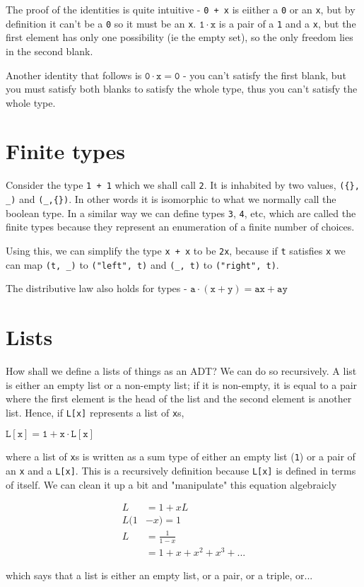 \documentclass{article}
\begin{document}
The proof of the identities is quite intuitive - \verb!0 + x! is eiither a \verb!0! or an \verb!x!, but by definition it can't be a \verb!0! so it must be an \verb!x!. $\mathtt{1\cdot x}$ is a pair of a \verb!1! and a \verb!x!, but the first element has only one possibility (ie the empty set), so the only freedom lies in the second blank.

Another identity that follows is $\mathtt{0\cdot x = 0}$ - you can't satisfy the first blank, but you must satisfy both blanks to satisfy the whole type, thus you can't satisfy the whole type. 

\section{Finite types}

Consider the type \verb!1 + 1! which we shall call \verb!2!. It is inhabited by two values, \verb!({}, _)! and \verb!(_,{})!. In other words it is isomorphic to what we normally call the boolean type. In a similar way we can define types \verb!3!, \verb!4!, etc, which are called the finite types because they represent an enumeration of a finite number of choices.

Using this, we can simplify the type \verb!x + x! to be \verb!2x!, because if \verb!t! satisfies \verb!x! we can map \verb!(t, _)! to \verb!("left", t)! and \verb!(_, t)! to \verb!("right", t)!.

The distributive law also holds for types - $\mathtt{a\cdot(x+y) = ax + ay}$

\section{Lists}

How shall we define a lists of things as an ADT? We can do so recursively. A list is either an empty list or a non-empty list; if it is non-empty, it is equal to a pair where the first element is the head of the list and the second element is another list. Hence, if \verb!L[x]! represents a list of \verb!x!s, 

$\mathtt{L[x] = 1 + x\cdot L[x]}$

where a list of \verb!x!s is written as a sum type of either an empty list (\verb!1!) or a pair of an \verb!x! and a \verb!L[x]!. This is a recursively definition because \verb!L[x]! is defined in terms of itself. We can clean it up a bit and "manipulate" this equation algebraicly

\begin{align*}
L &= 1 + xL \\
L(1&-x) = 1 \\
L &= \frac{1}{1-x} \\
&= 1 + x + x^2 + x^3 + ...
\end{align*}

which says that a list is either an empty list, or a pair, or a triple, or...
\end{document}

